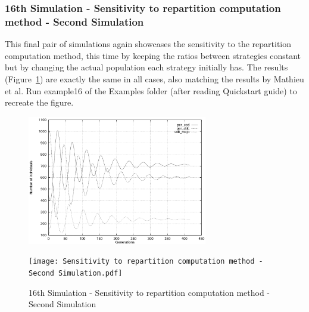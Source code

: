 \subsubsection{16th Simulation - Sensitivity to repartition computation method - Second Simulation}
This final pair of simulations again showcases the sensitivity to the repartition computation method, this time by keeping the ratios between strategies constant but by changing the actual population each strategy initially has. The results (Figure~\ref{fig:Sensitivity to repartition computation method - Second Simulation}) are exactly the same in all cases, also matching the results by Mathieu et al. Run example16 of the Examples folder (after reading Quickstart guide) to recreate the figure.
	\begin{figure}[h]
	    \centering
		\includegraphics[width=0.7\textwidth]{RefPaperFigures/fig12a.jpeg}\par\vspace{0.5em}
	    \texttt{[image: Sensitivity to repartition computation method - Second Simulation.pdf]}
	    \caption{16th Simulation - Sensitivity to repartition computation method - Second Simulation}
	    \label{fig:Sensitivity to repartition computation method - Second Simulation}
	\end{figure}
